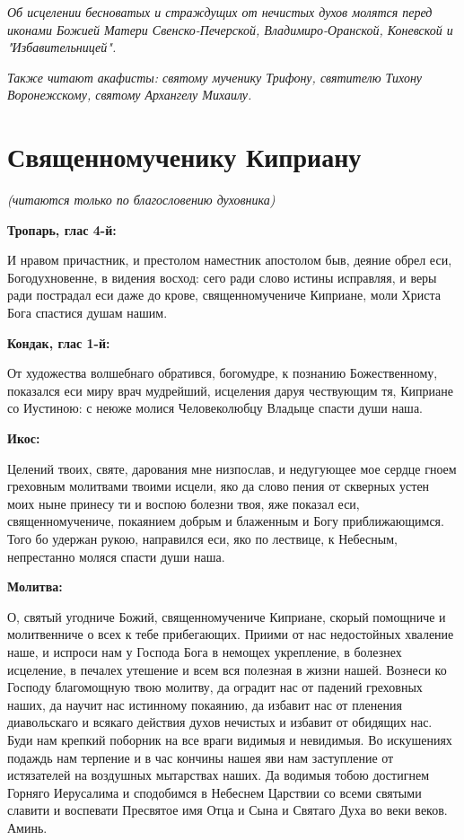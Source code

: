 \itshape Об исцелении бесноватых и страждущих от нечистых духов молятся перед иконами Божией Матери Свенско-Печерской, Владимиро-Оранской, Коневской и "Избавительницей".\normalfont{}


\itshape Также читают акафисты: святому мученику Трифону, святителю Тихону Воронежскому, святому Архангелу Михаилу.\normalfont{}


\section{Священномученику Киприану}
 


\itshape (читаются только по благословению духовника)\normalfont{}


\medskip


\bfseries Тропарь, глас 4-й:\normalfont{}


И нравом причастник, и престолом наместник апостолом быв, деяние обрел еси, Богодухновенне, в видения восход: сего ради слово истины исправляя, и веры ради пострадал еси даже до крове, священномучениче Киприане, моли Христа Бога спастися душам нашим.


\medskip


\bfseries Кондак, глас 1-й:\normalfont{}


От художества волшебнаго обратився, богомудре, к познанию Божественному, показался еси миру врач мудрейший, исцеления даруя чествующим тя, Киприане со Иустиною: с неюже молися Человеколюбцу Владыце спасти души наша.


\medskip


\bfseries Икос:\normalfont{}


Целений твоих, святе, дарования мне низпослав, и недугующее мое сердце гноем греховным молитвами твоими исцели, яко да слово пения от скверных устен моих ныне принесу ти и воспою болезни твоя, яже показал еси, священномучениче, покаянием добрым и блаженным и Богу приближающимся. Того бо удержан рукою, направился еси, яко по лествице, к Небесным, непрестанно моляся спасти души наша.


\medskip


\bfseries Молитва:\normalfont{}


О, святый угодниче Божий, священномучениче Киприане, скорый помощниче и молитвенниче о всех к тебе прибегающих. Приими от нас недостойных хваление наше, и испроси нам у Господа Бога в немощех укрепление, в болезнех исцеление, в печалех утешение и всем вся полезная в жизни нашей. Вознеси ко Господу благомощную твою молитву, да оградит нас от падений греховных наших, да научит нас истинному покаянию, да избавит нас от пленения диавольскаго и всякаго действия духов нечистых и избавит от обидящих нас. Буди нам крепкий поборник на все враги видимыя и невидимыя. Во искушениях подаждь нам терпение и в час кончины нашея яви нам заступление от истязателей на воздушных мытарствах наших. Да водимыя тобою достигнем Горняго Иерусалима и сподобимся в Небеснем Царствии со всеми святыми славити и воспевати Пресвятое имя Отца и Сына и Святаго Духа во веки веков. Аминь.


